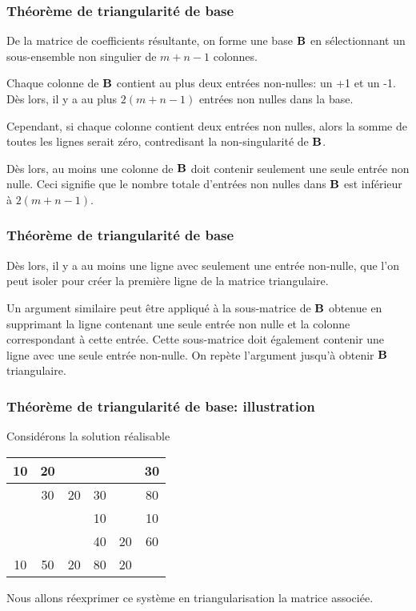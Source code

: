 \documentclass[usepdftitle=false, aspectratio=169]{beamer}
\begin{document}
\begin{frame}
\frametitle{Théorème de triangularité de base}

De la matrice de coefficients résultante, on forme une base ${\bf B}$ en sélectionnant un sous-ensemble non singulier de $m+n-1$ colonnes.

\mbox{}

Chaque colonne de ${\bf B}$ contient au plus deux entrées non-nulles: un +1 et un -1. Dès lors, il y a au plus $2(m+n-1)$ entrées non nulles dans la base. 

\mbox{}

Cependant, si chaque colonne contient deux entrées non nulles, alors la somme de toutes les lignes serait zéro, contredisant la non-singularité de ${\bf B}$.

\mbox{}

Dès lors, au moins une colonne de ${\bf B}$ doit contenir seulement une seule entrée non nulle. Ceci signifie que le nombre totale d'entrées non nulles dans ${\bf B}$ est inférieur à $2(m+n-1)$.

\end{frame}

\begin{frame}
\frametitle{Théorème de triangularité de base}

Dès lors, il y a au moins une ligne avec seulement une entrée non-nulle, que l'on peut isoler pour créer la première ligne de la matrice triangulaire.

\mbox{}

Un argument similaire peut être appliqué à la sous-matrice de ${\bf B}$ obtenue en supprimant la ligne contenant une seule entrée non nulle et la colonne correspondant à cette entrée. Cette sous-matrice doit également contenir une ligne avec une seule entrée non-nulle. On repète l'argument jusqu'à obtenir ${\bf B}$ triangulaire.

\end{frame}

\begin{frame}
\frametitle{Théorème de triangularité de base: illustration}

Considérons la solution réalisable
\begin{center}
\begin{tabular}{|c|c|c|c|c|c}
\hline
10 & 20 & & & & 30 \\
\hline
& 30 & 20 & 30 & & 80 \\
\hline
& & & 10 & & 10 \\
\hline
& & & 40 & 20 & 60 \\
\hline
10 & 50 & 20 & 80 & 20 & \\
\end{tabular}
\end{center}

Nous allons réexprimer ce système en triangularisation la matrice associée.

\end{frame}
\end{document}
